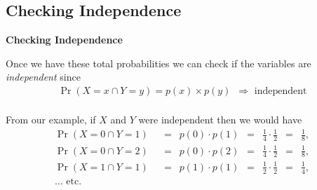 \documentclass[compress]{beamer}        %
\makeatletter
\newcommand{\tcb}{\textcolor{beamer@blendedblue}}
\makeatother
\begin{document}
\subsection{Checking Independence}
\begin{frame}{\bf \tcb{Checking Independence}}

Once we have these total probabilities we can check if the variables are \emph{independent} since\\[-0.3cm]

\begin{align*}
\boxed{\Pr(X=x \cap Y=y) = p(x) \times p(y) \,\,\,\Rightarrow \text{ independent}}\\[0.3cm]
\end{align*}

From our example, if $X$ and $Y$ were independent then we would have\\[-0.5cm]
\begin{align*}
\Pr(X=0 \cap Y=1) \,\,\,&=\,\,\, p(0)\cdot p(1) \,\,\,=\,\,\, \frac{1}{4}\cdot \frac{1}{2} \,\,\,=\,\,\, \frac{1}{8},\\[0.2cm]
\Pr(X=0 \cap Y=2) \,\,\,&=\,\,\, p(0)\cdot p(2) \,\,\,=\,\,\, \frac{1}{4}\cdot \frac{1}{2} \,\,\,=\,\,\, \frac{1}{8},\\[0.2cm]
\Pr(X=1 \cap Y=1) \,\,\,&= \,\,\, p(1)\cdot p(1) \,\,\, = \,\,\,\frac{1}{2}\cdot \frac{1}{2}\,\,\, =\,\,\, \frac{1}{4},\\[0.2cm]
\ldots \text{ etc.}
\end{align*}


\end{frame}
\end{document}
